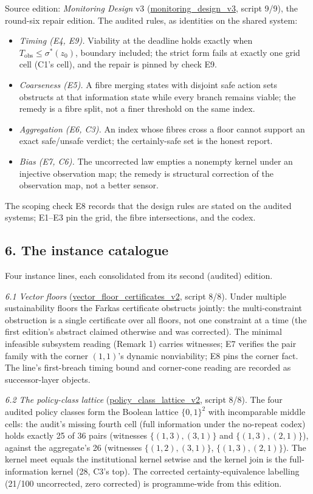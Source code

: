 \documentclass[10pt,twocolumn]{article}
\theoremstyle{definition}
\providecommand{\tightlist}{\setlength{\itemsep}{0pt}\setlength{\parskip}{0pt}}
\begin{document}
Source edition: \emph{Monitoring Design} v3
(\url{monitoring_design_v3}, script 9/9), the round-six repair
edition. The audited rules, as identities on the shared system:
\begin{itemize}
\tightlist
\item \emph{Timing (E4, E9).} Viability at the deadline holds exactly when
\(T_{\mathrm{obs}} \le \sigma^{*}(z_0)\), boundary included; the strict form
fails at exactly one grid cell (C1's cell), and the repair is pinned by
check E9.
\item \emph{Coarseness (E5).} A fibre merging states with disjoint safe
action sets obstructs at that information state while every branch remains
viable; the remedy is a fibre split, not a finer threshold on the same index.
\item \emph{Aggregation (E6, C3).} An index whose fibres cross a floor cannot
support an exact safe/unsafe verdict; the certainly-safe set is the honest
report.
\item \emph{Bias (E7, C6).} The uncorrected law empties a nonempty kernel
under an injective observation map; the remedy is structural correction of
the observation map, not a better sensor.
\end{itemize}
The scoping check E8 records that the design rules are stated on the audited
systems; E1--E3 pin the grid, the fibre intersections, and the codex.

\subsection{6. The instance catalogue}\label{catalogue}

Four instance lines, each consolidated from its second (audited) edition.

\emph{6.1 Vector floors}
(\url{vector_floor_certificates_v2}, script 8/8). Under multiple
sustainability floors the Farkas certificate obstructs jointly: the
multi-constraint obstruction is a single certificate over all floors, not
one constraint at a time (the first edition's abstract claimed otherwise and
was corrected). The minimal infeasible subsystem reading (Remark 1) carries
witnesses; E7 verifies the pair family with the corner \((1,1)\)'s dynamic
nonviability; E8 pins the corner fact. The line's first-breach timing bound
and corner-cone reading are recorded as successor-layer objects.

\emph{6.2 The policy-class lattice}
(\url{policy_class_lattice_v2}, script 8/8). The four audited policy
classes form the Boolean lattice \(\{0,1\}^2\) with incomparable middle
cells: the audit's missing fourth cell (full information under the no-repeat
codex) holds exactly 25 of 36 pairs (witnesses \(\{(1,3),(3,1)\}\) and
\(\{(1,3),(2,1)\}\)), against the aggregate's 26 (witnesses
\(\{(1,2),(3,1)\}\), \(\{(1,3),(2,1)\}\)). The kernel meet equals the
institutional kernel setwise and the kernel join is the full-information
kernel (28, C3's top). The corrected certainty-equivalence labelling
(21/100 uncorrected, zero corrected) is programme-wide from this edition.
\end{document}
